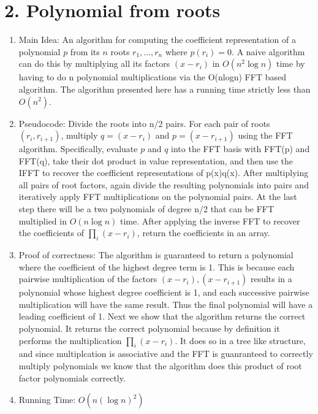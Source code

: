 \documentclass[11pt]{article}
\begin{document}
\section*{2. Polynomial from roots}
\begin{enumerate}
\item Main Idea: An algorithm for computing the coefficient representation of a polynomial $p$ from its $n$ roots $r_1,..., r_n$ where $p(r_i) = 0$. A naive algorithm can do this by multiplying all its factors $(x-r_i)$ in $O(n^2 \log n)$ time by having to do n polynomial multiplications via the O(nlogn) FFT based algorithm. The algorithm presented here has a running time strictly less than $O(n^2)$.
\item Pseudocode: Divide the roots into n/2 pairs. For each pair of roots $(r_i,r_{i+1})$, multiply $q = (x-r_i)$ and $p = (x-r_{i+1})$ using the FFT algorithm. Specifically, evaluate $p$ and $q$ into the FFT basis with FFT(p) and FFT(q), take their dot product in value representation, and then use the IFFT to recover the coefficient representations of p(x)q(x). After multiplying all pairs of root factors, again divide the resulting polynomials into pairs and iteratively apply FFT multiplications on the polynomial pairs. At the last step there will be a two polynomials of degree n/2 that can be FFT multiplied in $O(n\log n)$ time. After applying the inverse FFT to recover the coefficients of $\prod\limits_{i} (x-r_i)$, return the coefficients in an array.
\item Proof of correctness: The algorithm is guaranteed to return a polynomial where the coefficient of the highest degree term is 1. This is because each pairwise multiplication of the factors $(x-r_i),(x-r_{i+1})$ results in a polynomial whose highest degree coefficient is 1, and each successive pairwise multiplication will have the same result. Thus the final polynomial will have a leading coefficient of 1. Next we show that the algorithm returns the correct polynomial. It returns the correct polynomial because by definition it performs the multiplication $\prod\limits_{i} (x-r_i)$. It does so in a tree like structure, and since multiplcation is associative and the FFT is guanranteed to correctly multiply polynomials we know that the algorithm does this product of root factor polynomials correctly.
\item Running Time: $O(n(\log n)^2)$

\end{enumerate}
\end{document}
